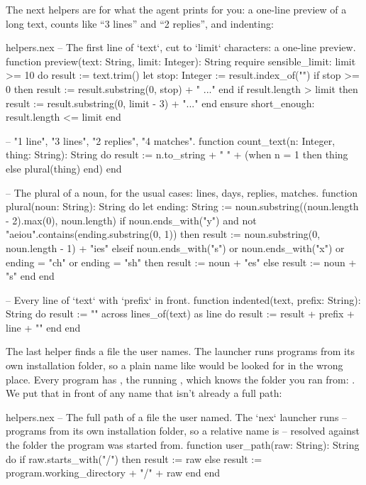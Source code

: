 The next helpers are for what the agent prints for you: a one-line preview
of a long text, counts like ``3 lines'' and ``2 replies'', and indenting:

\begin{append}{helpers.nex}
-- The first line of `text`, cut to `limit` characters: a one-line preview.
function preview(text: String, limit: Integer): String
require
  sensible_limit: limit >= 10
do
  result := text.trim()
  let stop: Integer := result.index_of("\n")
  if stop >= 0 then
    result := result.substring(0, stop) + " ..."
  end
  if result.length > limit then
    result := result.substring(0, limit - 3) + "..."
  end
ensure
  short_enough: result.length <= limit
end

-- "1 line", "3 lines", "2 replies", "4 matches".
function count_text(n: Integer, thing: String): String do
  result := n.to_string + " " + (when n = 1 then thing else plural(thing) end)
end

-- The plural of a noun, for the usual cases: lines, days, replies, matches.
function plural(noun: String): String do
  let ending: String := noun.substring((noun.length - 2).max(0), noun.length)
  if noun.ends_with("y") and not "aeiou".contains(ending.substring(0, 1)) then
    result := noun.substring(0, noun.length - 1) + "ies"
  elseif noun.ends_with("s") or noun.ends_with("x") or ending = "ch" or ending = "sh" then
    result := noun + "es"
  else
    result := noun + "s"
  end
end

-- Every line of `text` with `prefix` in front.
function indented(text, prefix: String): String do
  result := ""
  across lines_of(text) as line do
    result := result + prefix + line + "\n"
  end
end
\end{append}

The last helper finds a file the user names. The  launcher runs
programs from its own installation folder, so a plain name like
 would be looked for in the wrong place. Every program
has , the running , which knows the folder you
ran  from: . We put that in front
of any name that isn't already a full path:

\begin{append}{helpers.nex}
-- The full path of a file the user named. The `nex` launcher runs
-- programs from its own installation folder, so a relative name is
-- resolved against the folder the program was started from.
function user_path(raw: String): String do
  if raw.starts_with("/") then
    result := raw
  else
    result := program.working_directory + "/" + raw
  end
end
\end{append}

